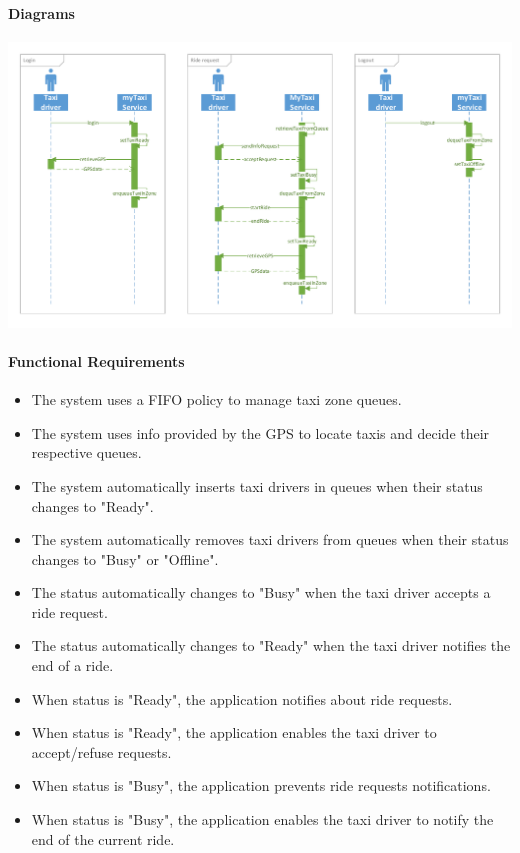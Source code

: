 \paragraph{Diagrams}
\begin{center}
	\includegraphics[width=\textwidth]{diagrams/availability}
\end{center}
\paragraph{Functional Requirements}
\begin{itemize}
	
	\item The system uses a FIFO policy to manage taxi zone queues.
	
	\item The system uses info provided by the GPS to locate taxis and decide their respective queues.
	
	\item The system automatically inserts taxi drivers in queues when their status changes to "Ready".
	
	\item The system automatically removes taxi drivers from queues when their status changes to "Busy" or "Offline".
	
	\item The status automatically changes to "Busy" when the taxi driver accepts a ride request.
	
	\item The status automatically changes to "Ready" when the taxi driver notifies the end of a ride.
	
	\item When status is "Ready", the application notifies about ride requests.
	
	\item When status is "Ready", the application enables the taxi driver to accept/refuse requests.
	
	\item When status is "Busy", the application prevents ride requests notifications.
	
	\item When status is "Busy", the application enables the taxi driver to notify the end of the current ride.
	
\end{itemize}

